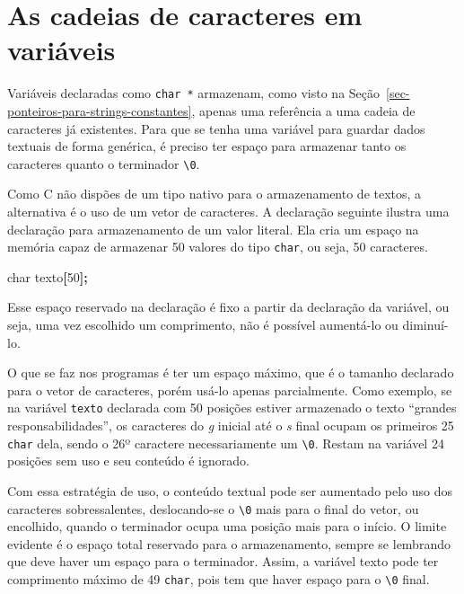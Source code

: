 \documentclass[
  11pt,
  a4paper,
]{scrbook}
\newenvironment{Shaded}{\begin{snugshade}}{\end{snugshade}}
\newcommand{\DataTypeTok}[1]{\textcolor[rgb]{0.13,0.29,0.53}{#1}}
\newcommand{\DecValTok}[1]{\textcolor[rgb]{0.00,0.00,0.81}{#1}}
\newcommand{\NormalTok}[1]{#1}
\newcommand{\OperatorTok}[1]{\textcolor[rgb]{0.81,0.36,0.00}{\textbf{#1}}}
\begin{document}
\section{As cadeias de caracteres em
variáveis}\label{as-cadeias-de-caracteres-em-variuxe1veis}

Variáveis declaradas como \texttt{char\ *} armazenam, como visto na
Seção~\ref{sec-ponteiros-para-strings-constantes}, apenas uma referência
a uma cadeia de caracteres já existentes. Para que se tenha uma variável
para guardar dados textuais de forma genérica, é preciso ter espaço para
armazenar tanto os caracteres quanto o terminador
\texttt{\textbackslash{}0}.

Como C não dispões de um tipo nativo para o armazenamento de textos, a
alternativa é o uso de um vetor de caracteres. A declaração seguinte
ilustra uma declaração para armazenamento de um valor literal. Ela cria
um espaço na memória capaz de armazenar 50 valores do tipo
\texttt{char}, ou seja, 50 caracteres.

\begin{Shaded}
\begin{Highlighting}[]
\DataTypeTok{char}\NormalTok{ texto}\OperatorTok{[}\DecValTok{50}\OperatorTok{];}
\end{Highlighting}
\end{Shaded}

Esse espaço reservado na declaração é fixo a partir da declaração da
variável, ou seja, uma vez escolhido um comprimento, não é possível
aumentá-lo ou diminuí-lo.

O que se faz nos programas é ter um espaço máximo, que é o tamanho
declarado para o vetor de caracteres, porém usá-lo apenas parcialmente.
Como exemplo, se na variável \texttt{texto} declarada com 50 posições
estiver armazenado o texto ``grandes responsabilidades'', os caracteres
do \emph{g} inicial até o \emph{s} final ocupam os primeiros 25
\texttt{char} dela, sendo o 26º caractere necessariamente um
\texttt{\textbackslash{}0}. Restam na variável 24 posições sem uso e seu
conteúdo é ignorado.

Com essa estratégia de uso, o conteúdo textual pode ser aumentado pelo
uso dos caracteres sobressalentes, deslocando-se o
\texttt{\textbackslash{}0} mais para o final do vetor, ou encolhido,
quando o terminador ocupa uma posição mais para o início. O limite
evidente é o espaço total reservado para o armazenamento, sempre se
lembrando que deve haver um espaço para o terminador. Assim, a variável
texto pode ter comprimento máximo de 49 \texttt{char}, pois tem que
haver espaço para o \texttt{\textbackslash{}0} final.
\end{document}
